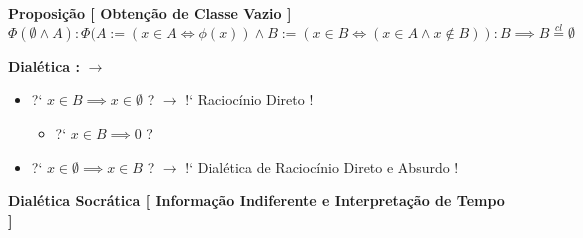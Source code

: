 \documentclass[10pt,a4paper]{report}
\begin{document}
\textbf{Proposição [ Obtenção de Classe Vazio ]}
$$ \Phi( \emptyset \wedge A ) : \Phi( A := ( x \in A \iff \phi(x) )  \wedge B:= (x \in B \iff (x \in A \wedge x \notin B)  )  : B \implies B \overset{cl}{=} \emptyset $$

\textbf{Dialética :} $\rightarrow$

\begin{itemize}
	\item[ ] ?` $ x \in B \implies x \in \emptyset $ ? $ \rightarrow $ !` Raciocínio Direto !
	\begin{itemize}
		\item[ ] ?` $ x \in B \implies  0 $  ?
	\end{itemize}
	\item[ ] ?` $ x \in \emptyset \implies x \in B $ ?	$\rightarrow$ !` Dialética de Raciocínio Direto e Absurdo !
\end{itemize}

\hspace{\baselineskip}

\textbf{Dialética Socrática [ Informação Indiferente e Interpretação de Tempo ]}
\end{document}
